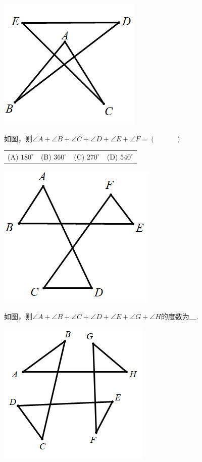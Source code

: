 \documentclass[10pt]{ctexart}
\newcommand{\onech}[4]{
\renewcommand\arraystretch{1.4}
\begin{tabularx}{\linewidth}{XXXX}
\setlength\tabcolsep{0pt}
(A) #1 & (B) #2 & (C) #3 & (D) #4 \\
\end{tabularx}
\unskip \unskip}
\begin{document}
 \includegraphics[scale=0.5]{figure/bazhi04.PNG}
\begin{shaded}
\begin{example}
如图，则$\angle A+\angle B+\angle C+\angle D+\angle E+\angle F=(~\hspace{1cm}~)$\\
\onech{$180^\circ$}{$360^\circ$}{$270^\circ$}{$540^\circ$}
\end{example}
\end{shaded}
 \includegraphics[scale=0.5]{figure/bazhi05.PNG}
\begin{shaded}
\begin{example}
如图，则$\angle A+\angle B+\angle C+\angle D+\angle E+\angle G+\angle H$的度数为\underline{~\hspace{1cm}~}.
\end{example}
\end{shaded}
 \includegraphics[scale=0.5]{figure/bazhi06.PNG}
\end{document}
